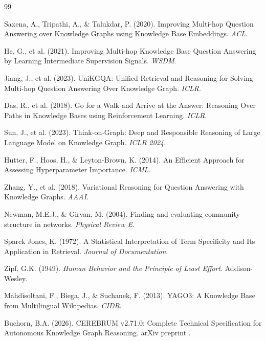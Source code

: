 \documentclass[10pt,twocolumn]{article}
\begin{document}

\begin{thebibliography}{99}

Saxena, A., Tripathi, A., \& Talukdar, P. (2020).
Improving Multi-hop Question Answering over Knowledge Graphs using Knowledge Base Embeddings.
\emph{ACL}.

He, G., et al. (2021).
Improving Multi-hop Knowledge Base Question Answering by Learning Intermediate Supervision Signals.
\emph{WSDM}.

Jiang, J., et al. (2023).
UniKGQA: Unified Retrieval and Reasoning for Solving Multi-hop Question Answering Over Knowledge Graph.
\emph{ICLR}.

Das, R., et al. (2018).
Go for a Walk and Arrive at the Answer: Reasoning Over Paths in Knowledge Bases using
Reinforcement Learning.
\emph{ICLR}.

Sun, J., et al. (2023).
Think-on-Graph: Deep and Responsible Reasoning of Large Language Model on Knowledge Graph.
\emph{ICLR 2024}.

Hutter, F., Hoos, H., \& Leyton-Brown, K. (2014).
An Efficient Approach for Assessing Hyperparameter Importance.
\emph{ICML}.

Zhang, Y., et al. (2018).
Variational Reasoning for Question Answering with Knowledge Graphs.
\emph{AAAI}.

Newman, M.E.J., \& Girvan, M. (2004).
Finding and evaluating community structure in networks.
\emph{Physical Review E}.

Sparck Jones, K. (1972).
A Statistical Interpretation of Term Specificity and Its Application in Retrieval.
\emph{Journal of Documentation}.

Zipf, G.K. (1949).
\emph{Human Behavior and the Principle of Least Effort}.
Addison-Wesley.

Mahdisoltani, F., Biega, J., \& Suchanek, F. (2013).
YAGO3: A Knowledge Base from Multilingual Wikipedias.
\emph{CIDR}.

Buchorn, B.A. (2026).
CEREBRUM v2.71.0: Complete Technical Specification for Autonomous Knowledge Graph Reasoning.
arXiv preprint \CEREBRUMReportID{}.

\end{thebibliography}
\end{document}
